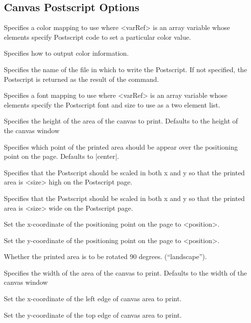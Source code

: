 
\subsection*{Canvas Postscript Options}
\begin{enum}{1cm}

\vspace{-10pt}

Specifies a color mapping to use where <varRef> is an  array  variable
whose elements  specify Postscript  code to set a particular color value.

Specifies how to output color  information.

Specifies the name of the file in which  to  write the  Postscript.
If not specified, the Postscript is returned as the result of the command.

Specifies a font mapping to use where <varRef> is an  array  variable
whose elements  specify the Postscript font and size to use as a two element list.

Specifies the height of the area of the canvas to print.  Defaults to
the height of the canvas window

Specifies which point of the printed  area  should be  appear  over the 
positioning point on the page. Defaults to |center|.

Specifies that the Postscript should be scaled in both x and y so that
the printed area is <size> high on the Postscript page.

Specifies that the Postscript should be scaled in both x and y so that
the printed area is <size> wide on the Postscript page.

Set the x-coordinate of the positioning point on the page to <position>.

Set the y-coordinate of the positioning point on the page to <position>.

Whether the printed area is to be rotated 90 degrees. (``landscape'').

Specifies the width of the area of the canvas to print.  Defaults to
the width of the canvas window

Set the x-coordinate of the left edge of canvas area to print.

Set the y-coordinate of the top edge of canvas area to print.

\end{enum}

